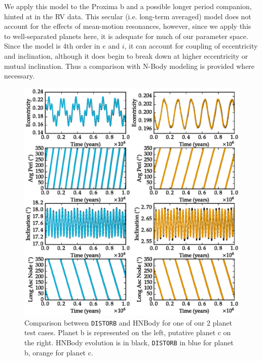 \documentclass[preprint,12pt]{aastex}
\def\distorb{\texttt{\footnotesize{DISTORB}}\xspace}
\begin{document}
We apply this model to the Proxima b and a possible longer period
companion, hinted at in the RV data. This secular (i.e. long-term
averaged) model does not account for the effects of mean-motion
resonances, however, since we apply this to well-separated planets
here, it is adequate for much of our parameter space. Since the model
is 4th order in $e$ and $i$, it can account for coupling of
eccentricity and inclination, although it does begin to break down at
higher eccentricity or mutual inclination. Thus a comparison with
N-Body modeling is provided where necessary.
 
\begin{figure}
\includegraphics[width=\textwidth]{orbcomp_mid_e_i.eps}
\caption{Comparison between \distorb and HNBody for one of our 2
   planet test cases. Planet b is represented on the left, putative
   planet c on the right. HNBody evolution is in black, \distorb in
   blue for planet b, orange for planet c.}
\label{fig:orbitvalid}
\end{figure}
 
\end{document}
